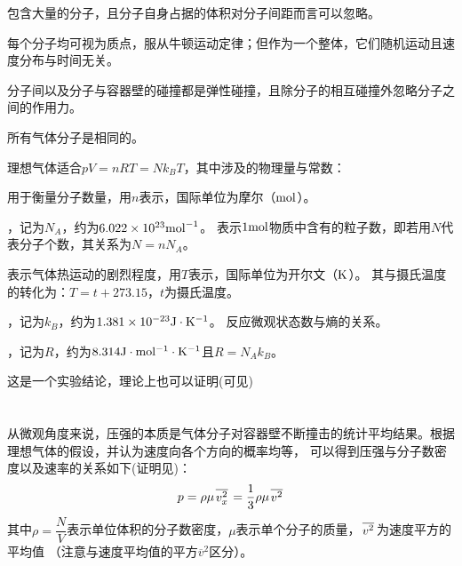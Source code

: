         \begin{Itemize}
            \item 包含大量的分子，且分子自身占据的体积对分子间距而言可以忽略。
            \item 每个分子均可视为质点，服从牛顿运动定律；但作为一个整体，它们随机运动且速度分布与时间无关。
            \item 分子间以及分子与容器壁的碰撞都是弹性碰撞，且除分子的相互碰撞外忽略分子之间的作用力。
            \item 所有气体分子是相同的。
        \end{Itemize}
        \newpage
        理想气体适合\quad$pV=nRT=Nk_{B}T$，其中涉及的物理量与常数：
        \\
        \begin{Itemize}
            \item {}用于衡量分子数量，用$n$表示，国际单位为摩尔（$\rm{mol}$）。
            \item {}，记为$N_{A}$，约为$6.022\times 10^{23}\rm{mol}^{-1}$。
            表示$1\rm{mol}$物质中含有的粒子数，即若用$N$代表分子个数，其关系为$N=nN_{A}$。
            \item {}表示气体热运动的剧烈程度，用$T$表示，国际单位为开尔文（$\rm{K}$）。
            其与摄氏温度的转化为：$T = t + 273.15$，$t$为摄氏温度。
            \item {}，记为$k_{B}$，约为$1.381\times 10^{-23}\rm{J}\cdot K^{-1}$。
            反应微观状态数与熵的关系。
            \item {}，记为$R$，约为$8.314\rm{J}\cdot mol^{-1}\cdot K^{-1}$且$R=N_{A}k_{B}$。
        \end{Itemize}

        这是一个实验结论，理论上也可以证明(可见)
    \section[分子动理论]{}
        \subsection[压强的微观解释]{}
            从微观角度来说，压强的本质是气体分子对容器壁不断撞击的统计平均结果。根据理想气体的假设，并认为速度向各个方向的概率均等，
            可以得到压强与分子数密度以及速率的关系如下(证明见)：
            \begin{equation}
                p = \rho \mu \upperline{v_{x}^{2}}=\frac{1}{3}\rho \mu \upperline{v^{2}}
                \nonumber
            \end{equation}
            其中$\rho = \dfrac{N}{V}$表示单位体积的分子数密度，$\mu$表示单个分子的质量，$\upperline{v^{2}}$为速度平方的平均值
            （注意与速度平均值的平方$\overline{v}^2$区分）。

